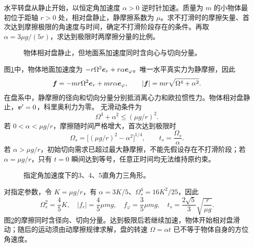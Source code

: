 \begin{example}[加速转盘上的静摩擦极限]\label{rot:problem-example-6}\label{rot:ex:d6-e6}
水平转盘从静止开始，以恒定角加速度 $\alpha>0$ 逆时针加速。质量为 $m$ 的小物体最初位于距轴 $r>0$ 处，相对盘静止，静摩擦系数为 $\mu$。求不打滑时的摩擦矢量、首次达到摩擦极限的角速度与时间，确定不打滑阶段存在的条件。再取 $\alpha=3\mu g/(5r)$，求达到极限时两摩擦分量的比例。
\end{example}
\begin{figure}[H]\centering
{}
\caption{物体相对盘静止，但地面系加速度同时含向心与切向分量。}\label{rot:fig:d6-e6-q}
\end{figure}
\begin{solution}
图\ref{rot:fig:d6-e6-q}中，物体地面加速度为 $-r\Omega^2\bm{e}_r+r\alpha\bm{e}_\varphi$。唯一水平真实力为静摩擦，因此
\[
\bm{f}=-mr\Omega^2\bm{e}_r+mr\alpha\bm{e}_\varphi,
\qquad |\bm{f}|=mr\sqrt{\Omega^4+\alpha^2}.
\]
在盘系中，静摩擦的径向和切向分量分别抵消离心力和欧拉惯性力。物体相对盘静止，$\bm{v}'=0$，科里奥利力为零。
无滑动条件为
\[
\Omega^4+\alpha^2\le(\mu g/r)^2.
\]
若 $0<\alpha<\mu g/r$，摩擦随时间严格增大，首次达到极限时
\[
\Omega_s=\big[(\mu g/r)^2-\alpha^2\big]^{1/4},
\qquad t_s=\frac{\Omega_s}{\alpha}.
\]
若 $\alpha>\mu g/r$，初始切向需求已超过最大静摩擦，不能先假设存在不打滑阶段；若 $\alpha=\mu g/r$，只有 $t=0$ 瞬间达到等号，任意正时间均无法维持原约束。
\begin{figure}[H]\centering
{}
\caption{指定角加速度下的3、4、5直角力三角形。}\label{rot:fig:d6-e6-s}
\end{figure}
对指定参数，令 $K=\mu g/r$，有 $\alpha=3K/5$、$\Omega_s^4=16K^2/25$，因此
\[
\Omega_s^2=\frac45K,\quad
|f_r|=\frac45\mu mg,\quad f_\varphi=\frac35\mu mg,
\quad t_s=\frac{2\sqrt5}{3}\sqrt{\frac r{\mu g}}.
\]
图\ref{rot:fig:d6-e6-s}的摩擦同时含径向、切向分量。达到极限后若继续加速，物体开始相对盘滑动；随后的运动须由动摩擦规律求解，盘的转速 $\Omega=\alpha t$ 已不等于物体自身的方位角速度。
\end{solution}



